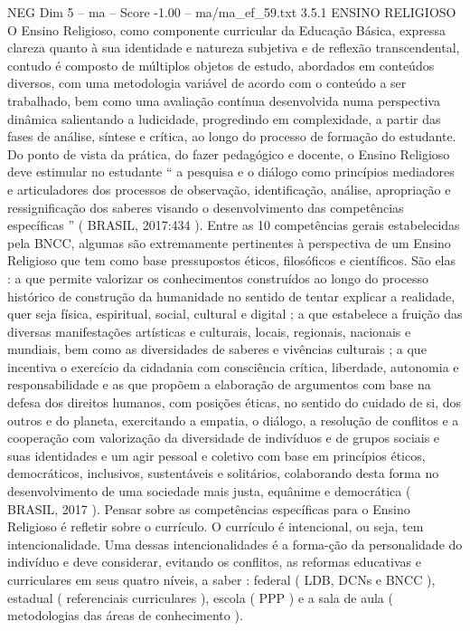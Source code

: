 \begin{textsample}{NEG Dim 5 – ma – Score -1.00 – ma/ma\_ef\_59.txt}  \label{ex:f5_neg_116}
3.5.1 ENSINO RELIGIOSO O Ensino Religioso, como componente curricular da Educação Básica, expressa clareza quanto à sua identidade e natureza subjetiva e de reflexão transcendental, contudo é composto de múltiplos objetos de estudo, abordados em conteúdos diversos, com uma metodologia variável de acordo com o conteúdo a ser trabalhado, bem como uma avaliação contínua desenvolvida numa perspectiva dinâmica salientando a ludicidade, progredindo em complexidade, a partir das fases de análise, síntese e crítica, ao longo do processo de formação do estudante.
Do ponto de vista da prática, do fazer pedagógico e docente, o Ensino Religioso deve estimular no estudante “ a pesquisa e o diálogo como princípios mediadores e articuladores dos processos de observação, identificação, análise, apropriação e ressignificação dos saberes visando o desenvolvimento das competências específicas ” ( BRASIL, 2017:434 ).
Entre as 10 competências gerais estabelecidas pela BNCC, algumas são extremamente pertinentes à perspectiva de um Ensino Religioso que tem como base pressupostos éticos, filosóficos e científicos.
São elas : a que permite valorizar os conhecimentos construídos ao longo do processo histórico de construção da humanidade no sentido de tentar explicar a realidade, quer seja física, espiritual, social, cultural e digital ; a que estabelece a fruição das diversas manifestações artísticas e culturais, locais, regionais, nacionais e mundiais, bem como as diversidades de saberes e vivências culturais ; a que incentiva o exercício da cidadania com consciência crítica, liberdade, autonomia e responsabilidade e as que propõem a elaboração de argumentos com base na defesa dos direitos humanos, com posições éticas, no sentido do cuidado de si, dos outros e do planeta, exercitando a empatia, o diálogo, a resolução de conflitos e a cooperação com valorização da diversidade de indivíduos e de grupos sociais e suas identidades e um agir pessoal e coletivo com base em princípios éticos, democráticos, inclusivos, sustentáveis e solitários, colaborando desta forma no desenvolvimento de uma sociedade mais justa, equânime e democrática ( BRASIL, 2017 ).
Pensar sobre as competências específicas para o Ensino Religioso é refletir sobre o currículo.
O currículo é intencional, ou seja, tem intencionalidade.
Uma dessas intencionalidades é a forma-ção da personalidade do indivíduo e deve considerar, evitando os conflitos, as reformas educativas e curriculares em seus quatro níveis, a saber : federal ( LDB, DCNs e BNCC ), estadual ( referenciais curriculares ), escola ( PPP ) e a sala de aula ( metodologias das áreas de conhecimento ).

\end{textsample}
